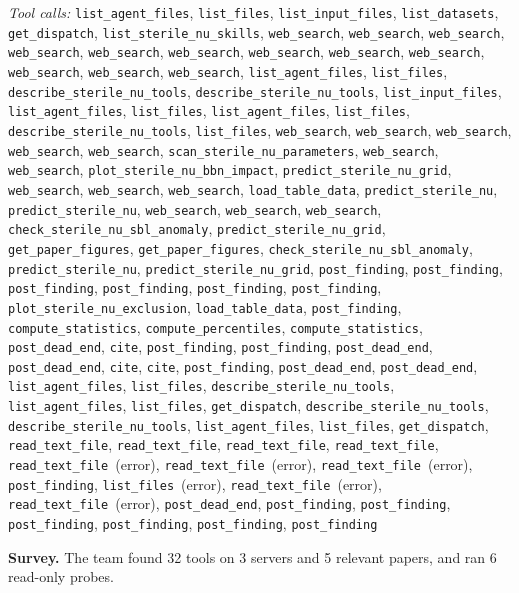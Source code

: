 \documentclass[11pt,a4paper]{article}
\begin{document}
\textit{Tool calls:} \texttt{list\_agent\_files}, \texttt{list\_files}, \texttt{list\_input\_files}, \texttt{list\_datasets}, \texttt{get\_dispatch}, \texttt{list\_sterile\_nu\_skills}, \texttt{web\_search}, \texttt{web\_search}, \texttt{web\_search}, \texttt{web\_search}, \texttt{web\_search}, \texttt{web\_search}, \texttt{web\_search}, \texttt{web\_search}, \texttt{web\_search}, \texttt{web\_search}, \texttt{web\_search}, \texttt{web\_search}, \texttt{list\_agent\_files}, \texttt{list\_files}, \texttt{describe\_sterile\_nu\_tools}, \texttt{describe\_sterile\_nu\_tools}, \texttt{list\_input\_files}, \texttt{list\_agent\_files}, \texttt{list\_files}, \texttt{list\_agent\_files}, \texttt{list\_files}, \texttt{describe\_sterile\_nu\_tools}, \texttt{list\_files}, \texttt{web\_search}, \texttt{web\_search}, \texttt{web\_search}, \texttt{web\_search}, \texttt{web\_search}, \texttt{scan\_sterile\_nu\_parameters}, \texttt{web\_search}, \texttt{web\_search}, \texttt{plot\_sterile\_nu\_bbn\_impact}, \texttt{predict\_sterile\_nu\_grid}, \texttt{web\_search}, \texttt{web\_search}, \texttt{web\_search}, \texttt{load\_table\_data}, \texttt{predict\_sterile\_nu}, \texttt{predict\_sterile\_nu}, \texttt{web\_search}, \texttt{web\_search}, \texttt{web\_search}, \texttt{check\_sterile\_nu\_sbl\_anomaly}, \texttt{predict\_sterile\_nu\_grid}, \texttt{get\_paper\_figures}, \texttt{get\_paper\_figures}, \texttt{check\_sterile\_nu\_sbl\_anomaly}, \texttt{predict\_sterile\_nu}, \texttt{predict\_sterile\_nu\_grid}, \texttt{post\_finding}, \texttt{post\_finding}, \texttt{post\_finding}, \texttt{post\_finding}, \texttt{post\_finding}, \texttt{post\_finding}, \texttt{plot\_sterile\_nu\_exclusion}, \texttt{load\_table\_data}, \texttt{post\_finding}, \texttt{compute\_statistics}, \texttt{compute\_percentiles}, \texttt{compute\_statistics}, \texttt{post\_dead\_end}, \texttt{cite}, \texttt{post\_finding}, \texttt{post\_finding}, \texttt{post\_dead\_end}, \texttt{post\_dead\_end}, \texttt{cite}, \texttt{cite}, \texttt{post\_finding}, \texttt{post\_dead\_end}, \texttt{post\_dead\_end}, \texttt{list\_agent\_files}, \texttt{list\_files}, \texttt{describe\_sterile\_nu\_tools}, \texttt{list\_agent\_files}, \texttt{list\_files}, \texttt{get\_dispatch}, \texttt{describe\_sterile\_nu\_tools}, \texttt{describe\_sterile\_nu\_tools}, \texttt{list\_agent\_files}, \texttt{list\_files}, \texttt{get\_dispatch}, \texttt{read\_text\_file}, \texttt{read\_text\_file}, \texttt{read\_text\_file}, \texttt{read\_text\_file}, \texttt{read\_text\_file}~(error), \texttt{read\_text\_file}~(error), \texttt{read\_text\_file}~(error), \texttt{post\_finding}, \texttt{list\_files}~(error), \texttt{read\_text\_file}~(error), \texttt{read\_text\_file}~(error), \texttt{post\_dead\_end}, \texttt{post\_finding}, \texttt{post\_finding}, \texttt{post\_finding}, \texttt{post\_finding}, \texttt{post\_finding}, \texttt{post\_finding}\par
\textbf{Survey.} The team found 32 tools on 3 servers and 5 relevant papers, and ran 6 read-only probes.
\end{document}
